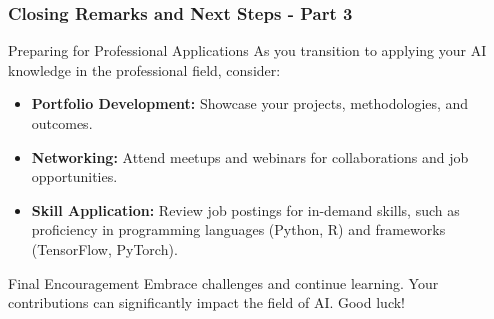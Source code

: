 \documentclass[aspectratio=169]{beamer}
\begin{document}
\begin{frame}[fragile]
    \frametitle{Closing Remarks and Next Steps - Part 3}

    \begin{block}{Preparing for Professional Applications}
        As you transition to applying your AI knowledge in the professional field, consider:
    \end{block}
    
    \begin{itemize}
        \item \textbf{Portfolio Development:} Showcase your projects, methodologies, and outcomes.
        \item \textbf{Networking:} Attend meetups and webinars for collaborations and job opportunities.
        \item \textbf{Skill Application:} Review job postings for in-demand skills, such as proficiency in programming languages (Python, R) and frameworks (TensorFlow, PyTorch).
    \end{itemize}

    \begin{block}{Final Encouragement}
        Embrace challenges and continue learning. Your contributions can significantly impact the field of AI. Good luck!
    \end{block}
\end{frame}
\end{document}
